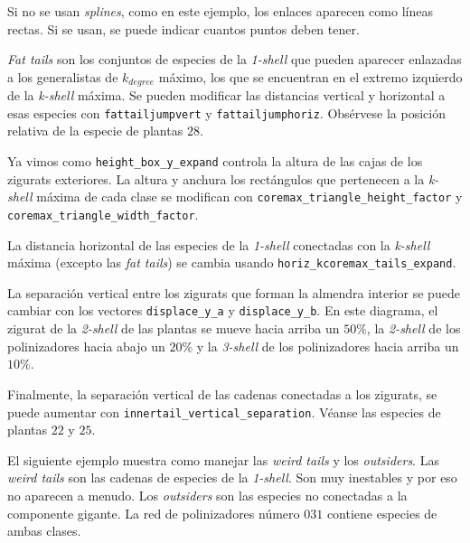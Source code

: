 Si no se usan \textit{splines}, como en este ejemplo, los enlaces aparecen como líneas rectas. Si se usan, se puede indicar cuantos puntos deben tener.

\textit{Fat tails} son los conjuntos de especies de la \textit{1-shell} que pueden aparecer enlazadas a los generalistas de $k_{degree}$ máximo, los que se encuentran en el extremo izquierdo de la \textit{k-shell} máxima. Se pueden modificar las distancias vertical y horizontal a esas especies con \texttt{fattailjumpvert} y \texttt{fattailjumphoriz}. Obsérvese la posición relativa de la especie de plantas $28$.

Ya vimos como \texttt{height\_box\_y\_expand} controla la altura de las cajas de los zigurats exteriores. La altura y anchura los rectángulos que pertenecen a la \textit{k-shell} máxima de cada clase se modifican con \texttt{coremax\_triangle\_height\_factor} y \texttt{coremax\_triangle\_width\_factor}. 

La distancia horizontal de las especies de la \textit{1-shell} conectadas con la \textit{k-shell} máxima (excepto las \textit{fat tails}) se cambia usando \texttt{horiz\_kcoremax\_tails\_expand}.

La separación vertical entre los zigurats que forman la almendra interior se puede cambiar con los vectores \texttt{displace\_y\_a} y \texttt{displace\_y\_b}. En este diagrama, el zigurat de la \textit{2-shell} de las plantas se mueve hacia arriba un $50\%$, la \textit{2-shell} de los polinizadores hacia abajo un $20\%$ y la \textit{3-shell} de los polinizadores hacia arriba un $10\%$.

Finalmente, la separación vertical de las cadenas conectadas a los zigurats, se puede aumentar con \texttt{innertail\_vertical\_separation}. Véanse las especies de plantas $22$ y $25$.

El siguiente ejemplo muestra como manejar las \textit{weird tails} y los \textit{outsiders}. Las \textit{weird tails} son las cadenas de especies de la \textit{1-shell}. Son muy inestables y por eso no aparecen a menudo. Los \textit{outsiders} son las especies no conectadas a la componente gigante. La red de polinizadores número $031$ contiene especies de ambas clases.

